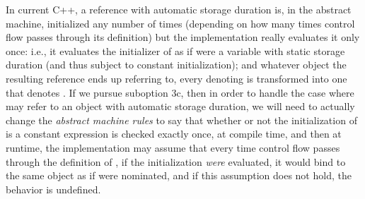 \documentclass{wg21}
\begin{document}
In current C++, a  reference  with automatic storage
duration is, in the abstract machine, initialized any number of times (depending
on how many times control flow passes through its definition) but the
implementation really evaluates it only once: i.e., it evaluates the initializer
of  as if  were a variable with static storage duration (and
thus subject to constant initialization); and whatever object  the
resulting reference ends up referring to, every 
denoting  is transformed into one that denotes . If we pursue
suboption 3c, then in order to handle the case where  may refer to an
object with automatic storage duration, we will need to actually change the
\emph{abstract machine rules} to say that whether or not the initialization of
 is a constant expression is checked exactly once, at compile time, and
then at runtime, the implementation may assume that every time control flow
passes through the definition of , if the initialization \emph{were}
evaluated, it would bind  to the same object as if  were
nominated, and if this assumption does not hold, the behavior is undefined.
\end{document}
